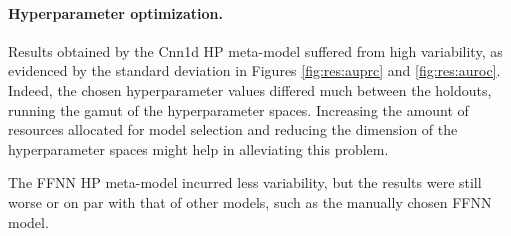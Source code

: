 \documentclass{article}
\begin{document}
\paragraph{Hyperparameter optimization.} Results obtained by the Cnn1d HP meta-model suffered from high variability, as evidenced by the standard deviation in Figures \ref{fig:res:auprc} and \ref{fig:res:auroc}. Indeed, the chosen hyperparameter values differed much between the holdouts, running the gamut of the hyperparameter spaces. Increasing the amount of resources allocated for model selection and reducing the dimension of the hyperparameter spaces might help in alleviating this problem.

The FFNN HP meta-model incurred less variability, but the results were still worse or on par with that of other models, such as the manually chosen FFNN model.
\end{document}
